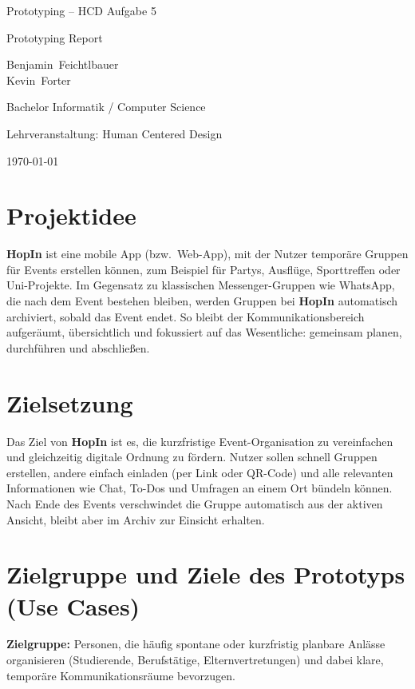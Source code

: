 \documentclass[11pt,a4paper]{article}
\newcommand{\appname}{\textbf{HopIn}}
\begin{document}
\begin{titlepage}
  \centering
  \vspace*{2cm}
  {\Huge Prototyping – HCD Aufgabe 5\par}
  \vspace{0.8cm}
  {\Large Prototyping Report\par}
  \vspace{2.0cm}
  {\large Benjamin~Feichtlbauer\\Kevin~Forter\par}
  {\large Bachelor Informatik / Computer Science\par}
  {\large Lehrveranstaltung: Human Centered Design\par}
  {\large \today\par}
\end{titlepage}


\section*{Projektidee}
\appname{} ist eine mobile App (bzw.\ Web-App), mit der Nutzer temporäre Gruppen für Events erstellen können, zum Beispiel für Partys, Ausflüge, Sporttreffen oder Uni-Projekte.
Im Gegensatz zu klassischen Messenger-Gruppen wie WhatsApp, die nach dem Event bestehen bleiben, werden Gruppen bei \appname{} automatisch archiviert, sobald das Event endet.
So bleibt der Kommunikationsbereich aufgeräumt, übersichtlich und fokussiert auf das Wesentliche: gemeinsam planen, durchführen und abschließen.

\section*{Zielsetzung}
Das Ziel von \appname{} ist es, die kurzfristige Event-Organisation zu vereinfachen und gleichzeitig digitale Ordnung zu fördern.
Nutzer sollen schnell Gruppen erstellen, andere einfach einladen (per Link oder QR-Code) und alle relevanten Informationen wie Chat, To-Dos und Umfragen an einem Ort bündeln können.
Nach Ende des Events verschwindet die Gruppe automatisch aus der aktiven Ansicht, bleibt aber im Archiv zur Einsicht erhalten.

\section*{Zielgruppe und Ziele des Prototyps (Use Cases)}
\textbf{Zielgruppe:} Personen, die häufig spontane oder kurzfristig planbare Anlässe organisieren (Studierende, Berufstätige, Elternvertretungen) und dabei klare, temporäre Kommunikationsräume bevorzugen.
\end{document}
